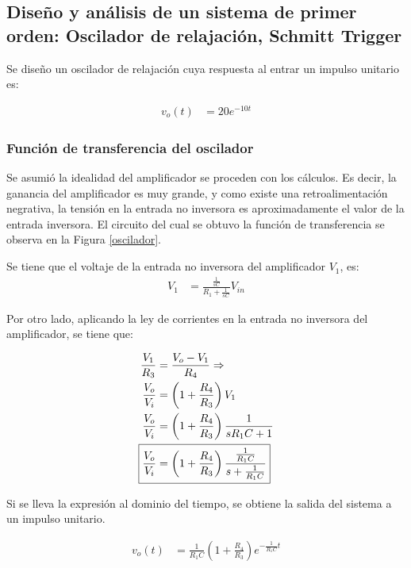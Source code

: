\documentclass[journal]{IEEEtran}
\begin{document}
\subsection{Dise\~no y an\'alisis de un sistema de primer
orden: Oscilador de relajaci\'on, Schmitt Trigger}

Se dise\~no un oscilador de relajaci\'on cuya respuesta al
entrar un impulso unitario es: 

\begin{align}
	\label{res_time} v_{o}(t) & = 20 e^{- 10 t}  
\end{align}

\subsubsection*{Funci\'on de transferencia del oscilador}
Se asumi\'o la idealidad del amplificador se proceden con 
los c\'alculos. Es decir, la ganancia del amplificador es 
muy grande, y como existe una retroalimentación negrativa,
la tensión en la entrada no inversora es aproximadamente el
valor de la entrada inversora. El circuito del cual se obtuvo
la funci\'on de transferencia se observa en la Figura
\ref{oscilador}. 



Se tiene que el voltaje de la entrada no inversora del amplificador $V_1$, es: 
\begin{align*}
	V_1 & = \frac{\frac{1}{s C}}{ R_1 + \frac{1}{s C}}
	 V_{in} 
\end{align*}

Por otro lado, aplicando la ley de corrientes en la entrada no inversora del amplificador, se tiene que: 

\begin{align*}
	\frac{V_1}{R_3} & = \frac{V_o -V_1}{R_4} \Rightarrow \\ 
	\frac{V_o}{V_i} & = \left( 1 + \frac{R_4}{R_3} \right)
	 V_{1} \\
	\frac{V_o}{V_i} & = \left
	( 1 + \frac{R_4}{R_3} \right)\frac{1}{ s R_1 C + 1} \\
	\Aboxed {\frac{V_o}{V_i} & = \left
	( 1 + \frac{R_4}{R_3} \right)
	\frac{\frac{1}{R_1 C}}{ s  + \frac{1}{R_1 C}}}
\end{align*}

Si se lleva la expresi\'on al dominio del tiempo, se obtiene
la salida del sistema a un impulso unitario.
  
\begin{align*}
	v_o(t) & = \frac{1}{R_1 C} 
	\left ( 1 + \frac{R_4}{R_3} \right) 
	 e^{- \frac{1}{R_1 C} t}  	
\end{align*}
\end{document}
